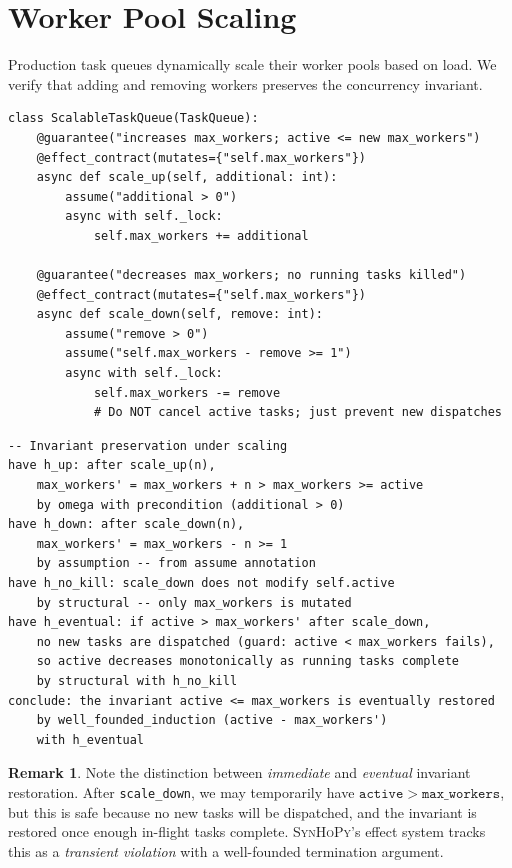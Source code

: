 \documentclass[11pt,a4paper]{report}
\theoremstyle{definition}
\newtheorem{remark}[definition]{Remark}
\theoremstyle{plain}
\newcommand{\synhopy}{\textsc{SynHoPy}}
\begin{document}
\section{Worker Pool Scaling}

Production task queues dynamically scale their worker pools based on load.
We verify that adding and removing workers preserves the concurrency
invariant.

\begin{lstlisting}[style=synhopy]
class ScalableTaskQueue(TaskQueue):
    @guarantee("increases max_workers; active <= new max_workers")
    @effect_contract(mutates={"self.max_workers"})
    async def scale_up(self, additional: int):
        assume("additional > 0")
        async with self._lock:
            self.max_workers += additional

    @guarantee("decreases max_workers; no running tasks killed")
    @effect_contract(mutates={"self.max_workers"})
    async def scale_down(self, remove: int):
        assume("remove > 0")
        assume("self.max_workers - remove >= 1")
        async with self._lock:
            self.max_workers -= remove
            # Do NOT cancel active tasks; just prevent new dispatches
\end{lstlisting}

\begin{lstlisting}[style=proof]
-- Invariant preservation under scaling
have h_up: after scale_up(n),
    max_workers' = max_workers + n > max_workers >= active
    by omega with precondition (additional > 0)
have h_down: after scale_down(n),
    max_workers' = max_workers - n >= 1
    by assumption -- from assume annotation
have h_no_kill: scale_down does not modify self.active
    by structural -- only max_workers is mutated
have h_eventual: if active > max_workers' after scale_down,
    no new tasks are dispatched (guard: active < max_workers fails),
    so active decreases monotonically as running tasks complete
    by structural with h_no_kill
conclude: the invariant active <= max_workers is eventually restored
    by well_founded_induction (active - max_workers')
    with h_eventual
\end{lstlisting}

\begin{remark}
Note the distinction between \emph{immediate} and \emph{eventual}
invariant restoration.  After \lstinline[style=python]{scale_down}, we
may temporarily have $\mathtt{active} > \mathtt{max\_workers}$, but
this is safe because no new tasks will be dispatched, and the invariant
is restored once enough in-flight tasks complete.  \synhopy{}'s effect
system tracks this as a \emph{transient violation} with a well-founded
termination argument.
\end{remark}
\end{document}
